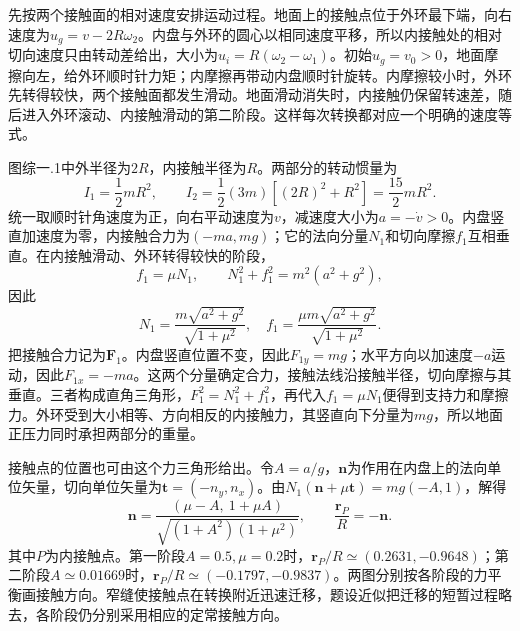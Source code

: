 \documentclass[UTF8,fontset=fandol,a4paper,11pt]{ctexart}
\begin{document}
先按两个接触面的相对速度安排运动过程。地面上的接触点位于外环最下端，向右速度为$u_g=v-2R\omega_2$。内盘与外环的圆心以相同速度平移，所以内接触处的相对切向速度只由转动差给出，大小为$u_i=R(\omega_2-\omega_1)$。初始$u_g=v_0>0$，地面摩擦向左，给外环顺时针力矩；内摩擦再带动内盘顺时针旋转。内摩擦较小时，外环先转得较快，两个接触面都发生滑动。地面滑动消失时，内接触仍保留转速差，随后进入外环滚动、内接触滑动的第二阶段。这样每次转换都对应一个明确的速度等式。

图综一.1中外半径为$2R$，内接触半径为$R$。两部分的转动惯量为
\[
I_1=\frac12mR^2,\qquad
I_2=\frac12(3m)[(2R)^2+R^2]=\frac{15}2mR^2.
\]
统一取顺时针角速度为正，向右平动速度为$v$，减速度大小为$a=-\dot v>0$。内盘竖直加速度为零，内接触合力为$(-ma,mg)$；它的法向分量$N_1$和切向摩擦$f_1$互相垂直。在内接触滑动、外环转得较快的阶段，
\[
f_1=\mu N_1,\qquad N_1^2+f_1^2=m^2(a^2+g^2),
\]
因此
\[
\boxed{N_1=\frac{m\sqrt{a^2+g^2}}{\sqrt{1+\mu^2}},
\quad f_1=\frac{\mu m\sqrt{a^2+g^2}}{\sqrt{1+\mu^2}}}.
\]
把接触合力记为$\boldsymbol F_1$。内盘竖直位置不变，因此$F_{1y}=mg$；水平方向以加速度$-a$运动，因此$F_{1x}=-ma$。这两个分量确定合力，接触法线沿接触半径，切向摩擦与其垂直。三者构成直角三角形，$F_1^2=N_1^2+f_1^2$，再代入$f_1=\mu N_1$便得到支持力和摩擦力。外环受到大小相等、方向相反的内接触力，其竖直向下分量为$mg$，所以地面正压力同时承担两部分的重量。

接触点的位置也可由这个力三角形给出。令$A=a/g$，$\boldsymbol n$为作用在内盘上的法向单位矢量，切向单位矢量为$\boldsymbol t=(-n_y,n_x)$。由$N_1(\boldsymbol n+\mu\boldsymbol t)=mg(-A,1)$，解得
\[
\boldsymbol n=\frac{(\mu-A,\ 1+\mu A)}{\sqrt{(1+A^2)(1+\mu^2)}},\qquad
\frac{\boldsymbol r_P}{R}=-\boldsymbol n.
\]
其中$P$为内接触点。第一阶段$A=0.5,\mu=0.2$时，$\boldsymbol r_P/R\simeq(0.2631,-0.9648)$；第二阶段$A\simeq0.01669$时，$\boldsymbol r_P/R\simeq(-0.1797,-0.9837)$。两图分别按各阶段的力平衡画接触方向。窄缝使接触点在转换附近迅速迁移，题设近似把迁移的短暂过程略去，各阶段仍分别采用相应的定常接触方向。
\end{document}
